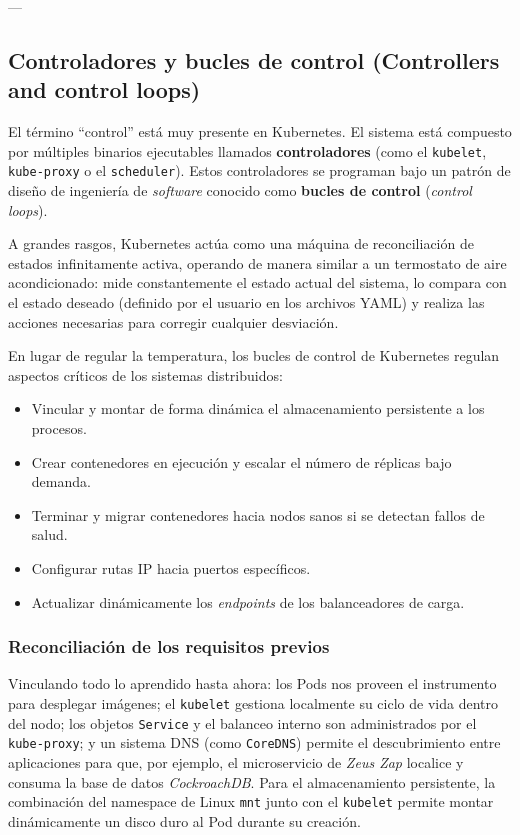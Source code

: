 ---

\subsection{Controladores y bucles de control (Controllers and control loops)}

El término ``control'' está muy presente en Kubernetes. El sistema está compuesto por múltiples binarios ejecutables llamados \textbf{controladores} (como el \texttt{kubelet}, \texttt{kube-proxy} o el \texttt{scheduler}). Estos controladores se programan bajo un patrón de diseño de ingeniería de \textit{software} conocido como \textbf{bucles de control} (\textit{control loops}).

A grandes rasgos, Kubernetes actúa como una máquina de reconciliación de estados infinitamente activa, operando de manera similar a un termostato de aire acondicionado: mide constantemente el estado actual del sistema, lo compara con el estado deseado (definido por el usuario en los archivos YAML) y realiza las acciones necesarias para corregir cualquier desviación. 

En lugar de regular la temperatura, los bucles de control de Kubernetes regulan aspectos críticos de los sistemas distribuidos:
\begin{itemize}
    \item Vincular y montar de forma dinámica el almacenamiento persistente a los procesos.
    \item Crear contenedores en ejecución y escalar el número de réplicas bajo demanda.
    \item Terminar y migrar contenedores hacia nodos sanos si se detectan fallos de salud.
    \item Configurar rutas IP hacia puertos específicos.
    \item Actualizar dinámicamente los \textit{endpoints} de los balanceadores de carga.
\end{itemize}

\subsubsection{Reconciliación de los requisitos previos}
Vinculando todo lo aprendido hasta ahora: los Pods nos proveen el instrumento para desplegar imágenes; el \texttt{kubelet} gestiona localmente su ciclo de vida dentro del nodo; los objetos \texttt{Service} y el balanceo interno son administrados por el \texttt{kube-proxy}; y un sistema DNS (como \texttt{CoreDNS}) permite el descubrimiento entre aplicaciones para que, por ejemplo, el microservicio de \textit{Zeus Zap} localice y consuma la base de datos \textit{CockroachDB}. Para el almacenamiento persistente, la combinación del namespace de Linux \texttt{mnt} junto con el \texttt{kubelet} permite montar dinámicamente un disco duro al Pod durante su creación.

